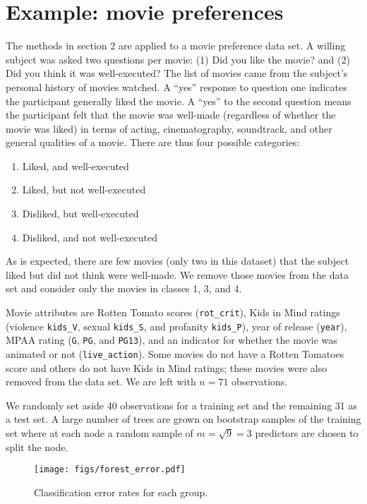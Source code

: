 \section{Example: movie preferences}

The methods in section 2 are applied to a movie preference data set. A willing subject was asked two questions per movie: (1) Did you like the movie? and (2) Did you think it was well-executed? The list of movies came from the subject's personal history of movies watched. A ``yes'' response to question one indicates the participant generally liked the movie. A ``yes'' to the second question means the participant felt that the movie was well-made (regardless of whether the movie was liked) in terms of acting, cinematography, soundtrack, and other general qualities of a movie. There are thus four possible categories:
\begin{enumerate}
\item Liked, and well-executed
\item Liked, but not well-executed
\item Disliked, but well-executed
\item Disliked, and not well-executed
\end{enumerate}
As is expected, there are few movies (only two in this dataset) that the subject liked but did not think were well-made. We remove those movies from the data set and consider only the movies in classes 1, 3, and 4.

Movie attributes are Rotten Tomato scores (\texttt{rot\_crit}), Kids in Mind ratings (violence \texttt{kids\_V}, sexual \texttt{kids\_S}, and profanity \texttt{kids\_P}), year of release (\texttt{year}), MPAA rating (\texttt{G}, \texttt{PG}, and \texttt{PG13}), and an indicator for whether the movie was animated or not (\texttt{live\_action}). Some movies do not have a Rotten Tomatoes score and others do not have Kids in Mind ratings; these movies were also removed from the data set. We are left with $n=71$ observations.

We randomly set aside 40 observations for a training set and the remaining 31 as a test set. A large number of trees are grown on bootstrap samples of the training set where at each node a random sample of $m=\sqrt{9}=3$ predictors are chosen to split the node.

\begin{figure}
\begin{center}
\texttt{[image: figs/forest\_error.pdf]}
\caption{Classification error rates for each group.}
\label{error}
\end{center}
\end{figure}

